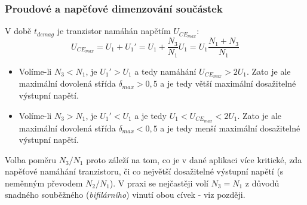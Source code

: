     \subsubsection{Proudové a napěťové dimenzování součástek}
      V době $t_{demag}$ je tranzistor namáhán napětím $U_{{CE}_{max}}$:
      \begin{equation}\label{ENZ:eq_dim_Ucemax}
        U_{{CE}_{max}} = U_1 + U_1' = U_1 + \frac{N_3}{N_1}U_1 = U_1\frac{N_1+N_3}{N_1}
      \end{equation}
      \begin{itemize}
       \item Volíme-li $N_3 < N_1$, je $U_1' > U_1$ a tedy namáhání $U_{{CE}_{max}} > 2U_1$. Zato
             je ale maximální dovolená střída $\delta_{max} > 0,5$ a je tedy větší maximální
             dosažitelné výstupní napětí.
       \item Volíme-li $N_3 > N_1$, je $U_1' < U_1$ a je tedy  $U_1 < U_{{CE}_{max}} < 2U_1$. Zato
             je ale maximální dovolená střída $\delta_{max} < 0,5$ a je tedy menší maximální
             dosažitelné výstupní napětí.
      \end{itemize}
      Volba  poměru  $N_3/N_1$ proto záleží na tom, co je v dané aplikaci více kritické, zda
      napěťové namáhání tranzistoru,  či co největší dosažitelné výstupní napětí (s neměnným
      převodem  $N_2/N_1$). V praxi se nejčastěji volí $N_3 = N_1$ z důvodů snadného souběžného
      (\emph{bifilárního}) vinutí obou cívek - viz později.
      
